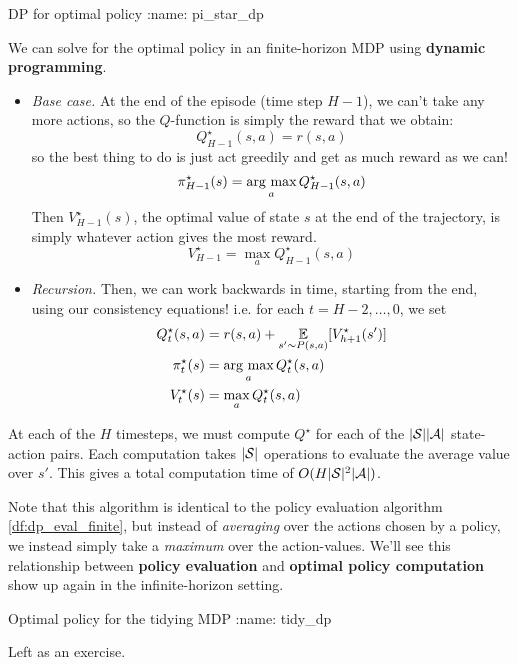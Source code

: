 \documentclass[\main/main]{subfiles}
\begin{document}
\begin{definition}{DP for optimal policy}
:name: pi_star_dp

    We can solve for the optimal policy in an finite-horizon MDP using \textbf{dynamic programming}.
    
    \begin{itemize}
    \item \emph{Base case.} At the end of the episode (time step $H-1$),
        we can't take any more actions, so the $Q$-function is simply the reward
        that we obtain:
        \[
            Q^\star_{H-1}(s, a) = r(s, a)
        \]
        so the best thing to do is just act greedily
        and get as much reward as we can!
        \[
            \pi^\star_{H-1}(s) = \argmax_a Q^\star_{H-1}(s, a)
        \]
        Then $V^\star_{H-1}(s)$, the optimal value of state $s$ at the end of the
        trajectory, is simply whatever action gives the most reward.
        \[
            V^\star_{H-1} = \max_a Q^\star_{H-1}(s, a)
        \]
    
    \item \emph{Recursion.} Then, we can work backwards in time, starting from the
        end, using our consistency equations! i.e. for each $t = H-2, \dots, 0$, we set
        \begin{align*}
            Q^\star_{t}(s, a) &= r(s, a) + \E_{s' \sim P(s, a)} [V^\star_{h+1}(s')] \\
            \pi^\star_{t}(s) &= \argmax_a Q^\star_{t}(s, a) \\
            V^\star_{t}(s) &= \max_a Q^\star_{t}(s, a)
        \end{align*}
    \end{itemize}
\end{definition}

At each of the $H$ timesteps, we must compute $Q^{\star}$ for each of the $|\S| |\A|$ state-action pairs. Each computation takes $|\S|$ operations to evaluate the average value over $s'$. This gives a total computation time of $O(H |\S|^2 |\A|)$.

Note that this algorithm is identical to the policy evaluation algorithm \ref{df:dp_eval_finite}, but instead of \emph{averaging} over the actions chosen by a policy, we instead simply take a \emph{maximum} over the action-values. We'll see this relationship between \textbf{policy evaluation} and \textbf{optimal policy computation} show up again in the infinite-horizon setting.

\begin{example}{Optimal policy for the tidying MDP}
:name: tidy_dp

    Left as an exercise.
\end{example}
\end{document}
